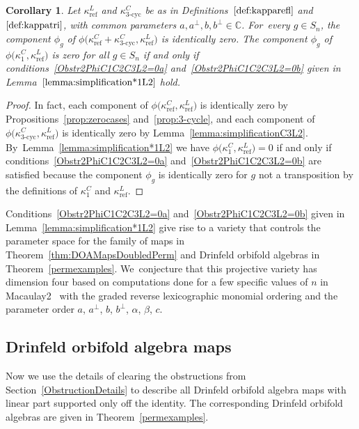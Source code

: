 \documentclass[10pt,a4paper]{amsart}
\numberwithin{equation}{section}
\newtheorem{Corollary}[Theorem]{Corollary}
\DeclareMathOperator{\refl}{ref}
\DeclareMathOperator{\tri}{3-cyc}
\begin{document}
\begin{Corollary}\label{cor:phiC3L2=0}
 Let $\kappa^L_{\refl}$ and $\kappa^C_{\tri}$ be as in Definitions~$\ref{def:kapparefl}$
 and~$\ref{def:kappatri}$, with common parameters $a,a^\perp,b,b^\perp \in\mathbb{C}$. For~every $g\in S_n$, the component $\phi_g$ of $\phi\big(\kappa^C_{\refl}+\kappa^C_{\tri},\kappa^L_{\refl}\big)$
 is identically zero. The component $\phi_g$ of $\phi\big(\kappa^C_1,\kappa^L_{\refl}\big)$
 is zero for all $g \in S_n$ if and only if conditions~\eqref{Obstr2PhiC1C2C3L2=0a}
 and~\eqref{Obstr2PhiC1C2C3L2=0b} given in Lemma~$\ref{lemma:simplification*1L2}$ hold.
\end{Corollary}

\begin{proof}
In fact, each component of $\phi\big(\kappa^C_{\refl},\kappa^L_{\refl}\big)$
is identically zero by Propositions~\ref{prop:zerocases} and~\ref{prop:3-cycle},
and each component of $\phi\big(\kappa^C_{\tri},\kappa^L_{\refl}\big)$ is identically zero
by Lemma~\ref{lemma:simplificationC3L2}. By~Lemma~\ref{lemma:simplification*1L2}
we have $\phi\big(\kappa^C_1,\kappa^L_{\refl}\big)=0$ if and only if
conditions~\eqref{Obstr2PhiC1C2C3L2=0a} and~\eqref{Obstr2PhiC1C2C3L2=0b}
are satisfied because the component $\phi_g$ is identically zero for $g$ not a
transposition by the definitions of $\kappa^C_1$ and $\kappa^L_{\refl}$.
\end{proof}

Conditions~\eqref{Obstr2PhiC1C2C3L2=0a} and~\eqref{Obstr2PhiC1C2C3L2=0b}
given in Lemma~\ref{lemma:simplification*1L2}
give rise to a variety that controls the para\-me\-ter space for the
family of maps in Theorem~\ref{thm:DOAMapsDoubledPerm}
and Drinfeld orbifold algebras in Theorem~\ref{permexamples}. We~conjecture that this projective variety has dimension four based on computations done
for a few specific values of $n$ in Macaulay2~\cite{M2} with the graded reverse
lexicographic monomial ordering and the
parameter order $a$, $a^\perp$, $b$, $b^\perp$, $\alpha$, $\beta$, $c$.


\subsection{Drinfeld orbifold algebra maps}
Now we use the details of clearing the obstructions from
Section~\ref{ObstructionDetails} to describe all Drinfeld orbi\-fold
algebra maps with linear part supported only off the identity.
The corresponding Drinfeld orbifold algebras are given in Theorem~\ref{permexamples}.
\end{document}
